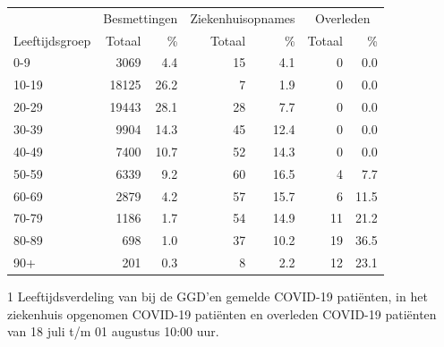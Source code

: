 \documentclass[
  english,
  man,floatsintext]{apa6}
\begin{document}
\begin{table}
\centering\begingroup\fontsize{11}{13}\selectfont

\begin{threeparttable}
\begin{tabular}{lrrrrrr}
\toprule
\multicolumn{1}{c}{ } & \multicolumn{2}{c}{Besmettingen} & \multicolumn{2}{c}{Ziekenhuisopnames} & \multicolumn{2}{c}{Overleden} \\
\cmidrule(l{3pt}r{3pt}){2-3} \cmidrule(l{3pt}r{3pt}){4-5} \cmidrule(l{3pt}r{3pt}){6-7}
Leeftijdsgroep & Totaal & \% & Totaal & \% & Totaal & \%\\
\midrule
0-9 & 3069 & 4.4 & 15 & 4.1 & 0 & 0.0\\
10-19 & 18125 & 26.2 & 7 & 1.9 & 0 & 0.0\\
20-29 & 19443 & 28.1 & 28 & 7.7 & 0 & 0.0\\
30-39 & 9904 & 14.3 & 45 & 12.4 & 0 & 0.0\\
40-49 & 7400 & 10.7 & 52 & 14.3 & 0 & 0.0\\
50-59 & 6339 & 9.2 & 60 & 16.5 & 4 & 7.7\\
60-69 & 2879 & 4.2 & 57 & 15.7 & 6 & 11.5\\
70-79 & 1186 & 1.7 & 54 & 14.9 & 11 & 21.2\\
80-89 & 698 & 1.0 & 37 & 10.2 & 19 & 36.5\\
90+ & 201 & 0.3 & 8 & 2.2 & 12 & 23.1\\
\bottomrule
\end{tabular}
\begin{tablenotes}
\item[1] Leeftijdsverdeling van bij de GGD’en gemelde COVID-19 patiënten, in het ziekenhuis opgenomen COVID-19 patiënten en overleden COVID-19 patiënten van 18 juli t/m 01 augustus 10:00 uur.
\end{tablenotes}
\end{threeparttable}
\endgroup{}
\end{table}

\newpage
\end{document}
